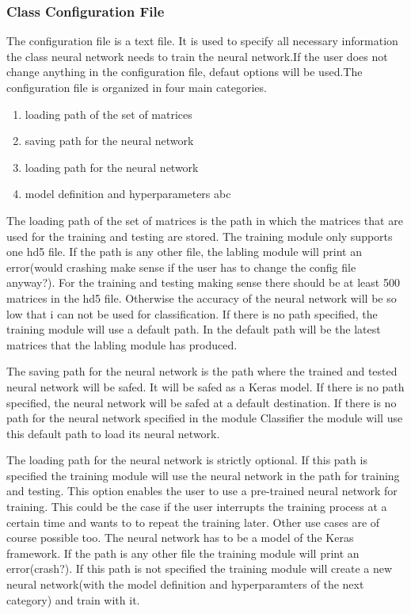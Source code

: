 \documentclass[parskip=full]{scrartcl}
\begin{document}
\subsubsection{Class Configuration File}
The configuration file is a text file. It is used to specify all necessary information the class neural network needs to train the neural network.If the user does not change anything in the configuration file, defaut options will be used.The configuration file is organized in four main categories. 
\begin{enumerate}
\item loading path of the set of matrices 
\item saving path for the neural network
\item loading path for the neural network
\item model definition and hyperparameters abc
\end{enumerate}
The loading path of the set of matrices is the path in which the matrices that are used for the training and testing are stored. The training module only supports one hd5 file. If the path is any other file, the labling module will print an error(would crashing make sense if the user has to change the config file anyway?). For the training and testing making sense there should be at least 500 matrices in the hd5 file. Otherwise the accuracy of the neural network will be so low that i can not be used for classification. If there is no path specified, the training module will use a default path. In the default path will be the latest matrices that the labling module has produced. \newline

The saving path for the neural network is the path where the trained and tested neural network will be safed. It will be safed as a Keras model. If there is no path specified, the neural network will be safed at a default destination. If there is no path for the neural network specified in the module Classifier the module will use this default path to load its neural network.\newline

The loading path for the neural network is strictly optional. If this path is specified the training module will use the neural network in the path for training and testing. This option enables the user to use a pre-trained neural network for training. This could be the case if the user interrupts the training process at a certain time and wants to to repeat the training later. Other use cases are of course possible too. The neural network has to be a model of the Keras framework. If the path is any other file the training module will print an error(crash?). If this path is not specified the training module will create a new neural network(with the model definition and hyperparamters of the next category) and train with it. \newline
\end{document}
